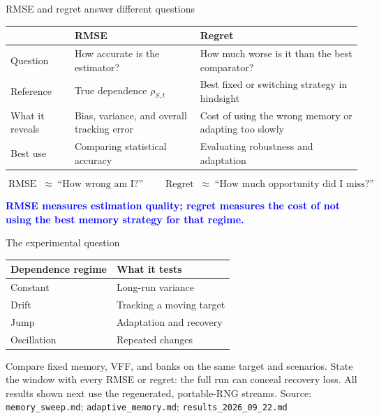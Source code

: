 \documentclass[aspectratio=169,11pt]{beamer}
\newcommand{\good}[1]{\textcolor{blue}{\textbf{#1}}}
\newcommand{\src}[1]{\vfill{\tiny\color{gray}Source: #1}}
\begin{document}
\begin{frame}{RMSE and regret answer different questions}

  \begin{center}
  \small
  \begin{tabular}{p{} p{} p{}}
    \toprule
    & \textbf{RMSE} & \textbf{Regret} \\
    \midrule

    Question
    & How accurate is the estimator?
    & How much worse is it than the best comparator? \\[1mm]

    Reference
    & True dependence $\rho_{S,t}$
    & Best fixed or switching strategy in hindsight \\[1mm]

    What it reveals
    & Bias, variance, and overall tracking error
    & Cost of using the wrong memory or adapting too slowly \\[1mm]

    Best use
    & Comparing statistical accuracy
    & Evaluating robustness and adaptation \\

    \bottomrule
  \end{tabular}
  \end{center}

  \medskip

  \[
    \operatorname{RMSE}
    \;\approx\;
    \text{``How wrong am I?''}
    \qquad
    \operatorname{Regret}
    \;\approx\;
    \text{``How much opportunity did I miss?''}
  \]

  \good{RMSE measures estimation quality; regret measures the cost of not using
  the best memory strategy for that regime.}

\end{frame}

\begin{frame}{The experimental question}
  \begin{center}
  \begin{tabular}{ll}
    \toprule
    Dependence regime & What it tests\\
    \midrule
    Constant & Long-run variance\\
    Drift & Tracking a moving target\\
    Jump & Adaptation and recovery\\
    Oscillation & Repeated changes\\
    \bottomrule
  \end{tabular}
  \end{center}
  \medskip
  Compare fixed memory, VFF, and banks on the same target and scenarios.
  State the window with every RMSE or regret: the full run can conceal recovery loss.
  All results shown next use the regenerated, portable-RNG streams.
  \src{\texttt{memory\_sweep.md}; \texttt{adaptive\_memory.md}; \texttt{results\_2026\_09\_22.md}}
\end{frame}
\end{document}
